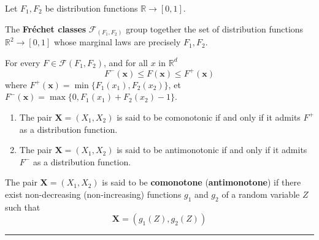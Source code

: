 \begin{f}
Let \(F_1,F_2\) be distribution functions \(\mathbb{R}\rightarrow [0,1]\).

The \textbf{Fréchet classes} \(\mathcal{F}_{(F_1,F_2)}\) group together the set of distribution functions \(\mathbb{R}^2\rightarrow [0,1]\)
whose marginal laws are precisely \(F_1,F_2\).
	
For every \(F \in \mathcal{F} (F_1,F_2)\), and for all \(x\) in \(\mathbb{R}^d\)
\[
F^-(\boldsymbol{x})\leq F (\boldsymbol{x})\leq F^+(\boldsymbol{x})
\]
where \(F^+(\boldsymbol{x}) = \min \{F_1(x_1),F_2(x_2)\}\), et 
\(F^-(\boldsymbol{x}) = \max\{0,F_1(x_1) +F_2(x_2)-1\}\).



\begin{enumerate}
	\item The pair \(\boldsymbol{X}=(X_1,X_2)\) is said to be comonotonic if and only if it admits \(F^+\) as a distribution function.
	\item The pair \(\boldsymbol{X}=(X_1,X_2)\) is said to be antimonotonic if and only if it admits \(F^-\) as a distribution function.
\end{enumerate}

The pair \(\boldsymbol{X}=(X_1,X_2)\) is said to be \textbf{comonotone} (\textbf{antimonotone}) if there exist non-decreasing (non-increasing) functions \(g_1\) and \(g_2\) of a random variable \(Z\) such that
\[
\boldsymbol{X}=(g_1(Z),g_2(Z))
\]
\end{f}
\hrule

